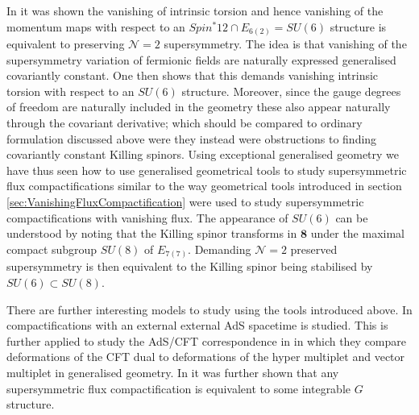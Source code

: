 In \cite{Coimbra:2014uxa,Ashmore:2015joa} it was shown the vanishing of intrinsic torsion and hence vanishing of the momentum maps with respect to an $Spin^*{12}\cap E_{6(2)}=SU(6)$ structure is equivalent to preserving $\mathcal{N}=2$ supersymmetry. The idea is that vanishing of the supersymmetry variation of fermionic fields are naturally expressed generalised covariantly constant. One then shows that this demands vanishing intrinsic torsion with respect to an $SU(6)$ structure. Moreover, since the gauge degrees of freedom are naturally included in the geometry these also appear naturally through the covariant derivative; which should be compared to ordinary formulation discussed above were they instead were obstructions to finding covariantly constant Killing spinors. Using exceptional generalised geometry we have thus seen how to use generalised geometrical tools to study supersymmetric flux compactifications similar to the way geometrical tools introduced in section \ref{sec:VanishingFluxCompactification} were used to study supersymmetric compactifications with vanishing flux. The appearance of $SU(6)$ can be understood by noting that the Killing spinor transforms in $\mathbf{8}$ under the maximal compact subgroup $SU(8)$ of $E_{7(7)}$. Demanding $\mathcal{N}=2$ preserved supersymmetry is then equivalent to the Killing spinor being stabilised by $SU(6)\subset SU(8)$. 


There are further interesting models to study using the tools introduced above. In \cite{Grana:2016dyl,Ashmore:2016qvs} compactifications with an external external AdS spacetime is studied. This is further applied to study the AdS/CFT correspondence in \cite{Ashmore:2016oug} in which they compare deformations of the CFT dual to deformations of the hyper multiplet and vector multiplet in generalised geometry. In \cite{Coimbra:2016ydd} it was further shown that any supersymmetric flux compactification is equivalent to some integrable $G$ structure. 



